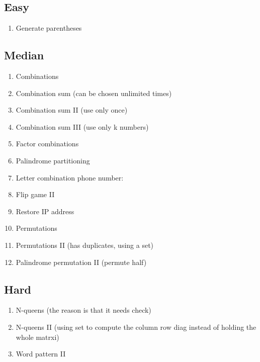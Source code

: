 \documentclass[DIV=calc, paper=a4, fontsize=11pt, twocolumn]{scrartcl}	 %
\begin{document}
\subsection*{Easy}
\begin{enumerate}
\item Generate parentheses
\end{enumerate}

\subsection*{Median}
\begin{enumerate}
\item Combinations \cite{077}
\item Combination sum (can be chosen unlimited times) \cite{039}
\item Combination sum II (use only once) \cite{040}
\item Combination sum III (use only k numbers) \cite{216}
\item Factor combinations \cite{254}
\item Palindrome partitioning \cite{131}
\item Letter combination phone number: \cite{017} 
\item {\color{red} Flip game II} \cite{293} 
\item Restore IP address \cite{093}
\item Permutations \cite{046} 
\item Permutations II (has duplicates, using a set)
\item Palindrome permutation II (permute half)
\end{enumerate}

\subsection*{Hard}
\begin{enumerate}
\item N-queens (the reason is that it needs check)
\item N-queens II (using set to compute the column row diag instead of holding the whole matrxi)
\item Word pattern II
\end{enumerate}

{}

\end{document}

